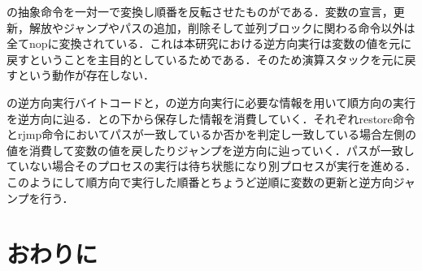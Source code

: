 \documentclass[submit,PRO]{ipsj}
\begin{document}
の抽象命令を一対一で変換し順番を反転させたものがである．変数の宣言，更新，解放やジャンプやパスの追加，削除そして並列ブロックに関わる命令以外は全てnopに変換されている．これは本研究における逆方向実行は変数の値を元に戻すということを主目的としているためである．そのため演算スタックを元に戻すという動作が存在しない．

の逆方向実行バイトコードと，の逆方向実行に必要な情報を用いて順方向の実行を逆方向に辿る．との下から保存した情報を消費していく．それぞれrestore命令とrjmp命令においてパスが一致しているか否かを判定し一致している場合左側の値を消費して変数の値を戻したりジャンプを逆方向に辿っていく．パスが一致していない場合そのプロセスの実行は待ち状態になり別プロセスが実行を進める．このようにして順方向で実行した順番とちょうど逆順に変数の更新と逆方向ジャンプを行う．



\section{おわりに}
\end{document}
